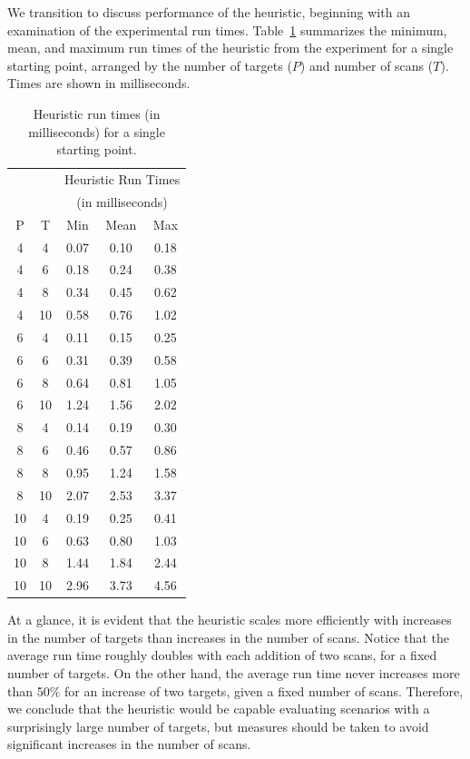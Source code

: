 We transition to discuss performance of the heuristic, beginning with an examination of the experimental run times. Table~\ref{tab:Basic_heuristic_times} summarizes the minimum, mean, and maximum run times of the heuristic from the experiment for a single starting point, arranged by the number of targets ($P$) and number of scans ($T$). Times are shown in milliseconds. 

\begin{table}[ht]
\centering
\begin{tabular}{cc|ccc}
  \hline
   & & \multicolumn{3}{c}{Heuristic Run Times } \\
   & & \multicolumn{3}{c}{(in milliseconds)}\\
   P & T & Min & Mean & Max \\ 
  \hline
  \hline
   4 & 4 & 0.07 & 0.10 & 0.18 \\ 
   4 & 6 & 0.18 & 0.24 & 0.38 \\ 
   4 & 8 & 0.34 & 0.45 & 0.62 \\ 
   4 & 10 & 0.58 & 0.76 & 1.02 \\ 
   6 & 4 & 0.11 & 0.15 & 0.25 \\ 
   6 & 6 & 0.31 & 0.39 & 0.58 \\ 
   6 & 8 & 0.64 & 0.81 & 1.05 \\ 
   6 & 10 & 1.24 & 1.56 & 2.02 \\ 
   8 & 4 & 0.14 & 0.19 & 0.30 \\ 
   8 & 6 & 0.46 & 0.57 & 0.86 \\ 
   8 & 8 & 0.95 & 1.24 & 1.58 \\ 
   8 & 10 & 2.07 & 2.53 & 3.37 \\ 
   10 & 4 & 0.19 & 0.25 & 0.41 \\ 
   10 & 6 & 0.63 & 0.80 & 1.03 \\ 
   10 & 8 & 1.44 & 1.84 & 2.44 \\ 
   10 & 10 & 2.96 & 3.73 & 4.56 \\ 
   \hline
\end{tabular}
\caption{Heuristic run times (in milliseconds) for a single starting point.}
\label{tab:Basic_heuristic_times}
\end{table}

At a glance, it is evident that the heuristic scales more efficiently with increases in the number of targets than increases in the number of scans. Notice that the average run time roughly doubles with each addition of two scans, for a fixed number of targets. On the other hand, the average run time never increases more than 50$\%$ for an increase of two targets, given a fixed number of scans. Therefore, we conclude that the heuristic would be capable evaluating scenarios with a surprisingly large number of targets, but measures should be taken to avoid significant increases in the number of scans. 

